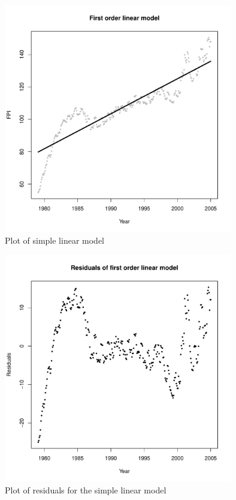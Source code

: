 \documentclass[11pt]{article}
\begin{document}
\begin{figure}
    \centering
    \includegraphics[width=100mm]{fitted-linear-model.pdf}
    \caption{Plot of simple linear model}
    \label{fig:fitted-linear-model}
\end{figure}

\begin{figure}
    \centering
    \includegraphics[width=100mm]{fitted-linear-model-residuals.pdf}
    \caption{Plot of residuals for the simple linear model}
    \label{fig:fitted-linear-model-residuals}
\end{figure}
\end{document}
